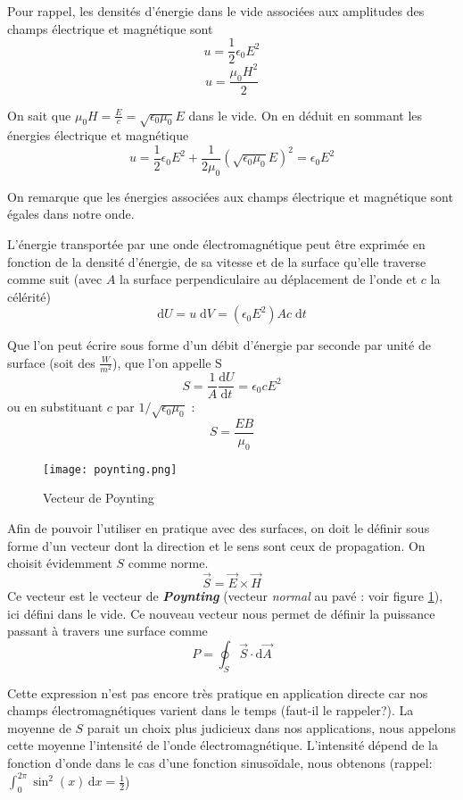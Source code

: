 Pour rappel, les densités d'énergie dans le vide associées aux amplitudes des champs électrique et magnétique sont 
\[u=\frac{1}{2}\epsilon_0E^{2}\]
\[u=\frac{\mu_0H^{2}}{2}\]

On sait que $\mu_0H=\frac{E}{c}=\sqrt{ \epsilon_0 \mu_0 }E$ dans le vide. On en déduit en sommant les énergies électrique et magnétique
\[u=\frac{1}{2}\epsilon_0E^{2} + \frac{1}{2\mu_0}(\sqrt{ \epsilon_0 \mu_0 }E)^{2} = \epsilon_0E^{2}\]

On remarque que les énergies associées aux champs électrique et magnétique sont égales dans notre onde.

L'énergie transportée par une onde électromagnétique peut être exprimée en fonction de la densité d'énergie, de sa vitesse et de la surface qu'elle traverse comme suit (avec $A$ la surface perpendiculaire au déplacement de l'onde et $c$ la célérité)
\[\mathrm{d}U=u\; \mathrm{d}V=(\epsilon_0E^{2})Ac\; \mathrm{d}t\]

Que l'on peut écrire sous forme d'un débit d'énergie par seconde par unité de surface (soit des $\frac{W}{m^{2}}$), que l'on appelle S
\[S=\frac{1}{A}\frac{\mathrm{d}U}{\mathrm{d}t}=\epsilon_0cE^{2}\]
ou en substituant $c$ par $1/\sqrt{\epsilon_0 \mu_0}$ :
\[S=\frac{EB}{\mu_0}\]

\begin{figure}
	\centering
	\texttt{[image: poynting.png]}
	\caption{Vecteur de Poynting}
	\label{poynting}
\end{figure}

Afin de pouvoir l'utiliser en pratique avec des surfaces, on doit le définir sous forme d'un vecteur dont la direction et le sens sont ceux de propagation. On choisit évidemment $S$ comme norme.
\[\vec{S}=\vec{E} \times \vec{H} \]
Ce vecteur est le vecteur de \textit{\textbf{Poynting}} (vecteur \textit{normal} au pavé : voir figure \ref{poynting}), ici défini dans le vide.
Ce nouveau vecteur nous permet de définir la puissance passant à travers une surface comme
\[P=\oint_{S}\vec{S} \cdot \mathrm{d}\vec{A}\] %

Cette expression n'est pas encore très pratique en application directe car nos champs électromagnétiques varient dans le temps (faut-il le rappeler?). La moyenne de $S$ parait un choix plus judicieux dans nos applications, nous appelons cette moyenne l'intensité de l'onde électromagnétique. L'intensité dépend de la fonction d'onde dans le cas  d'une fonction sinusoïdale, nous obtenons (rappel: $\int_0^{2\pi} \sin^{2}(x) \, \mathrm{d}x = \frac{1}{2}$)

